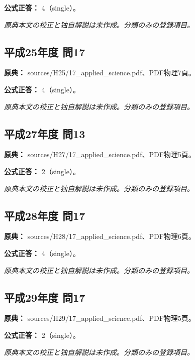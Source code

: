 \textbf{公式正答：} 4（single）。

\par\textit{原典本文の校正と独自解説は未作成。分類のみの登録項目。}

\subsection{平成25年度 問17}
\label{q:h25-reg-applied-17}

\noindent\textbf{原典：} sources/H25/17\_applied\_science.pdf、PDF物理7頁。

\textbf{公式正答：} 4（single）。

\par\textit{原典本文の校正と独自解説は未作成。分類のみの登録項目。}

\subsection{平成27年度 問13}
\label{q:h27-reg-applied-13}

\noindent\textbf{原典：} sources/H27/17\_applied\_science.pdf、PDF物理5頁。

\textbf{公式正答：} 2（single）。

\par\textit{原典本文の校正と独自解説は未作成。分類のみの登録項目。}

\subsection{平成28年度 問17}
\label{q:h28-reg-applied-17}

\noindent\textbf{原典：} sources/H28/17\_applied\_science.pdf、PDF物理6頁。

\textbf{公式正答：} 4（single）。

\par\textit{原典本文の校正と独自解説は未作成。分類のみの登録項目。}

\subsection{平成29年度 問17}
\label{q:h29-reg-applied-17}

\noindent\textbf{原典：} sources/H29/17\_applied\_science.pdf、PDF物理5頁。

\textbf{公式正答：} 2（single）。

\par\textit{原典本文の校正と独自解説は未作成。分類のみの登録項目。}

